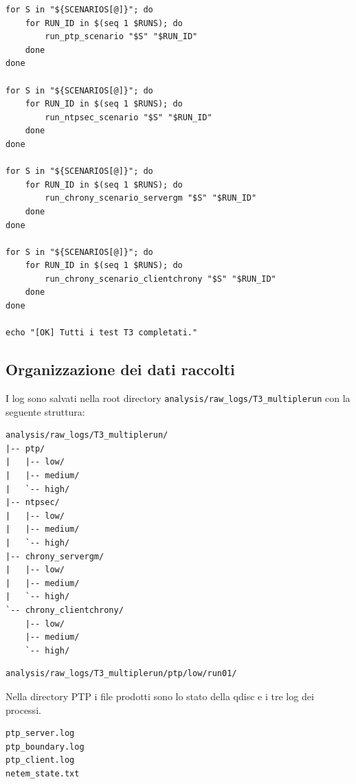 \begin{listing}[H]
\begin{verbatim}
for S in "${SCENARIOS[@]}"; do
    for RUN_ID in $(seq 1 $RUNS); do
        run_ptp_scenario "$S" "$RUN_ID"
    done
done

for S in "${SCENARIOS[@]}"; do
    for RUN_ID in $(seq 1 $RUNS); do
        run_ntpsec_scenario "$S" "$RUN_ID"
    done
done

for S in "${SCENARIOS[@]}"; do
    for RUN_ID in $(seq 1 $RUNS); do
        run_chrony_scenario_servergm "$S" "$RUN_ID"
    done
done

for S in "${SCENARIOS[@]}"; do
    for RUN_ID in $(seq 1 $RUNS); do
        run_chrony_scenario_clientchrony "$S" "$RUN_ID"
    done
done

echo "[OK] Tutti i test T3 completati."
\end{verbatim}
\caption{Ciclo finale di esecuzione delle run.}
\label{lst:auto-final-loop}
\end{listing}

\subsection{Organizzazione dei dati raccolti}

I log sono salvati nella root directory \texttt{analysis/raw\_logs/T3\_multiplerun}
con la seguente struttura:

\begin{lstlisting}[caption={Organizzazione generale dei log sperimentali.},label={lst:auto-log-tree}]
analysis/raw_logs/T3_multiplerun/
|-- ptp/
|   |-- low/
|   |-- medium/
|   `-- high/
|-- ntpsec/
|   |-- low/
|   |-- medium/
|   `-- high/
|-- chrony_servergm/
|   |-- low/
|   |-- medium/
|   `-- high/
`-- chrony_clientchrony/
    |-- low/
    |-- medium/
    `-- high/
\end{lstlisting}

\begin{lstlisting}[caption={Esempio di percorso per una run PTP.},label={lst:auto-ptp-path}]
analysis/raw_logs/T3_multiplerun/ptp/low/run01/
\end{lstlisting}

Nella directory PTP i file prodotti sono lo stato della qdisc e i tre log dei processi.

\begin{lstlisting}[caption={File prodotti da una run PTP.},label={lst:auto-ptp-files}]
ptp_server.log
ptp_boundary.log
ptp_client.log
netem_state.txt
\end{lstlisting}

